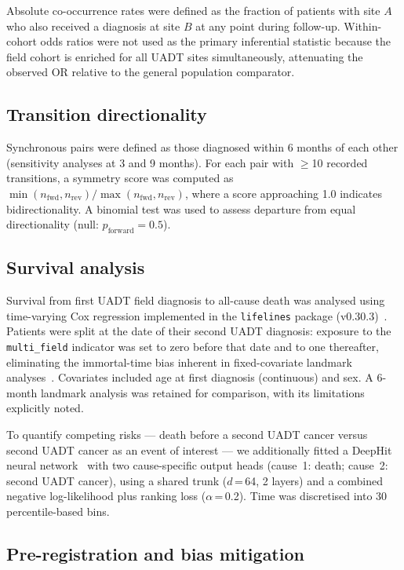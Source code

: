 \documentclass[12pt,a4paper]{article}
\begin{document}
Absolute co-occurrence rates were defined as the fraction of patients with site $A$
who also received a diagnosis at site $B$ at any point during follow-up.
Within-cohort odds ratios were not used as the primary inferential statistic
because the field cohort is enriched for all UADT sites simultaneously,
attenuating the observed OR relative to the general population comparator.

\subsection{Transition directionality}

Synchronous pairs were defined as those diagnosed within 6 months of each other
(sensitivity analyses at 3 and 9 months). For each pair with $\geq$10 recorded
transitions, a symmetry score was computed as
$\min(n_{\text{fwd}}, n_{\text{rev}}) / \max(n_{\text{fwd}}, n_{\text{rev}})$,
where a score approaching 1.0 indicates bidirectionality.
A binomial test was used to assess departure from equal directionality (null:
$p_{\text{forward}} = 0.5$).

\subsection{Survival analysis}

Survival from first UADT field diagnosis to all-cause death was analysed using
time-varying Cox regression implemented in the \texttt{lifelines} package
(v0.30.3)~\citep{davidson2019}. Patients were split at the date of their
second UADT diagnosis: exposure to the \texttt{multi\_field} indicator was set
to zero before that date and to one thereafter, eliminating the immortal-time
bias inherent in fixed-covariate landmark analyses~\citep{suissa2008}.
Covariates included age at first diagnosis (continuous) and sex.
A 6-month landmark analysis was retained for comparison, with its limitations
explicitly noted.

To quantify competing risks — death before a second UADT cancer versus second
UADT cancer as an event of interest — we additionally fitted a DeepHit neural
network~\citep{lee2018deephit} with two cause-specific output heads (cause~1:
death; cause~2: second UADT cancer), using a shared trunk ($d$\,=\,64, 2 layers)
and a combined negative log-likelihood plus ranking loss ($\alpha$\,=\,0.2).
Time was discretised into 30 percentile-based bins.

\subsection{Pre-registration and bias mitigation}
\end{document}
